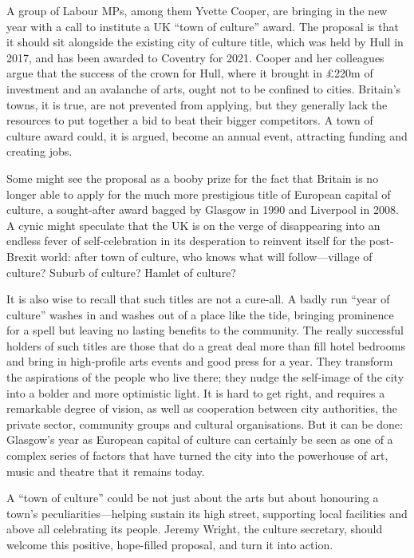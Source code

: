 A group of Labour MPs, among them Yvette Cooper, are bringing in the new
year with a call to institute a UK ``town of culture'' award. The
proposal is that it should sit alongside the existing city of culture
title, which was held by Hull in 2017, and has been awarded to Coventry
for 2021. Cooper and her colleagues argue that the success of the crown
for Hull, where it brought in £220m of investment and an avalanche of
arts, ought not to be confined to cities. Britain's towns, it is true,
are not prevented from applying, but they generally lack the resources
to put together a bid to beat their bigger competitors. A town of
culture award could, it is argued, become an annual event, attracting
funding and creating jobs.

Some might see the proposal as a booby prize for the fact that Britain
is no longer able to apply for the much more prestigious title of
European capital of culture, a sought-after award bagged by Glasgow in
1990 and Liverpool in 2008. A cynic might speculate that the UK is on
the verge of disappearing into an endless fever of self-celebration in
its desperation to reinvent itself for the post-Brexit world: after town
of culture, who knows what will follow---village of culture? Suburb of
culture? Hamlet of culture?


It is also wise to recall that such titles are not a cure-all. A badly
run ``year of culture'' washes in and washes out of a place like the
tide, bringing prominence for a spell but leaving no lasting benefits to
the community. The really successful holders of such titles are those
that do a great deal more than fill hotel bedrooms and bring in
high-profile arts events and good press for a year. They transform the
aspirations of the people who live there; they nudge the self-image of
the city into a bolder and more optimistic light. It is hard to get
right, and requires a remarkable degree of vision, as well as
cooperation between city authorities, the private sector, community
groups and cultural organisations. But it can be done: Glasgow's year as
European capital of culture can certainly be seen as one of a complex
series of factors that have turned the city into the powerhouse of art,
music and theatre that it remains today.

A ``town of culture'' could be not just about the arts but about
honouring a town's peculiarities---helping sustain its high street,
supporting local facilities and above all celebrating its people. Jeremy
Wright, the culture secretary, should welcome this positive, hope-filled
proposal, and turn it into action.


